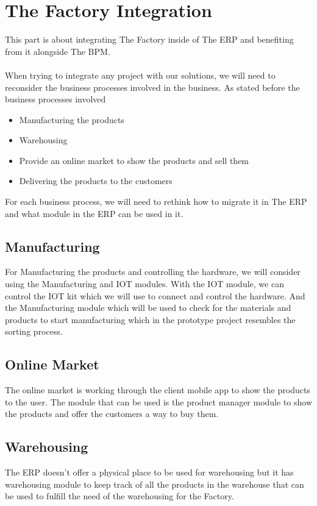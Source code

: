 \chapter{The Factory Integration}
This part is about integrating The Factory inside of The ERP and benefiting from it alongside The
BPM.\\\\

When trying to integrate any project with our solutions, we will need to reconsider the business
processes involved in the business. As stated before the business processes involved
\begin{itemize}
    \item Manufacturing the products
    \item Warehousing
    \item Provide an online market to show the products and sell them
    \item Delivering the products to the customers
\end{itemize}
For each business process, we will need to rethink how to migrate it in The ERP and what module in
the ERP can be used in it.

\section{Manufacturing}

For Manufacturing the products and controlling the hardware, we will consider using the
Manufacturing and IOT modules. With the IOT module, we can control the IOT kit which we will
use to connect and control the hardware. And the Manufacturing module which will be used to check
for the materials and products to start manufacturing which in the prototype project resembles the
sorting process.
\section{Online Market}
The online market is working through the client mobile app to show the products to the user. The
module that can be used is the product manager module to show the products and offer the
customers a way to buy them.
\section{Warehousing}
The ERP doesn’t offer a physical place to be used for warehousing but it has warehousing module to
keep track of all the products in the warehouse that can be used to fulfill the need of the warehousing
for the Factory.
